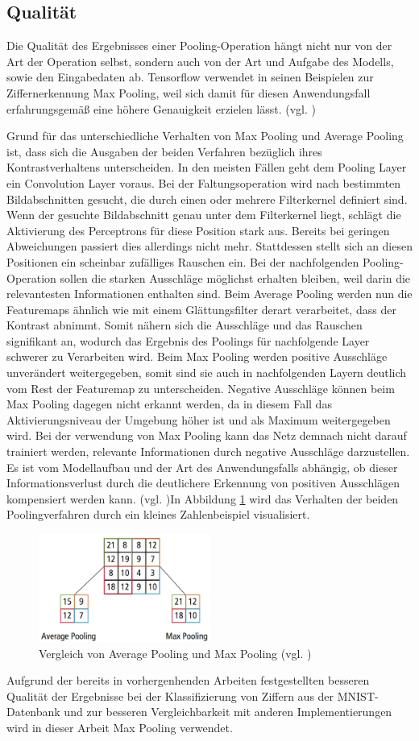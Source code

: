 \documentclass[../main.tex]{subfiles}
\begin{document}
\subsection{Qualität}
Die Qualität des Ergebnisses einer Pooling-Operation hängt nicht nur von der Art der Operation selbst, sondern auch von der Art und Aufgabe des Modells, sowie den Eingabedaten ab. Tensorflow verwendet in seinen Beispielen zur Ziffernerkennung Max Pooling, weil sich damit für diesen Anwendungsfall erfahrungsgemäß eine höhere Genauigkeit erzielen lässt. (vgl. \cite{tensorflowTutorial})

Grund für das unterschiedliche Verhalten von Max Pooling und Average Pooling ist, dass sich die Ausgaben der beiden Verfahren bezüglich ihres Kontrastverhaltens unterscheiden. In den meisten Fällen geht dem Pooling Layer ein Convolution Layer voraus. Bei der Faltungsoperation wird nach bestimmten Bildabschnitten gesucht, die durch einen oder mehrere Filterkernel definiert sind. Wenn der gesuchte Bildabschnitt genau unter dem Filterkernel liegt, schlägt die Aktivierung des Perceptrons für diese Position stark aus. Bereits bei geringen Abweichungen passiert dies allerdings nicht mehr. Stattdessen stellt sich an diesen Positionen ein scheinbar zufälliges Rauschen ein. Bei der nachfolgenden Pooling-Operation sollen die starken Ausschläge möglichst erhalten bleiben, weil darin die relevantesten Informationen enthalten sind. Beim Average Pooling werden nun die Featuremaps ähnlich wie mit einem Glättungsfilter derart verarbeitet, dass der Kontrast abnimmt. Somit nähern sich die Ausschläge und das Rauschen signifikant an, wodurch das Ergebnis des Poolings für nachfolgende Layer schwerer zu Verarbeiten wird. Beim Max Pooling werden positive Ausschläge unverändert weitergegeben, somit sind sie auch in nachfolgenden Layern deutlich vom Rest der Featuremap zu unterscheiden. Negative Ausschläge können beim Max Pooling dagegen nicht erkannt werden, da in diesem Fall das Aktivierungsniveau der Umgebung höher ist und als Maximum weitergegeben wird. Bei der verwendung von Max Pooling kann das Netz demnach nicht darauf trainiert werden, relevante Informationen durch negative Ausschläge darzustellen. Es ist vom Modellaufbau und der Art des Anwendungsfalls abhängig, ob dieser Informationsverlust durch die deutlichere Erkennung von positiven Ausschlägen kompensiert werden kann. (vgl. \cite{paperMixedPooling})In Abbildung \ref{pic:pooling_avg_max} wird das Verhalten der beiden Poolingverfahren durch ein kleines Zahlenbeispiel visualisiert. 
\begin{figure}
    \centering 
       \includegraphics[width=0.5\textwidth]{../images/Schmidt/pooling_avg_max.jpg} 
    \caption {Vergleich von Average Pooling und Max Pooling (vgl. \cite{articleCadenceCNN})} 
    \label{pic:pooling_avg_max} 
\end{figure} 
Aufgrund der bereits in vorhergenhenden Arbeiten festgestellten besseren Qualität der Ergebnisse bei der Klassifizierung von Ziffern aus der MNIST-Datenbank und zur besseren Vergleichbarkeit mit anderen Implementierungen wird in dieser Arbeit Max Pooling verwendet. 
\end{document}
